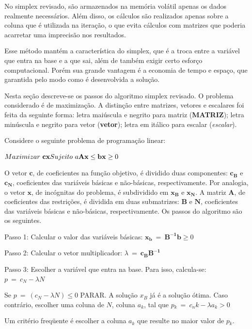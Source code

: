 No simplex revisado, são armazenados na memória volátil apenas os dados realmente necessários. Além disso, os cálculos são realizados apenas sobre a coluna que é utilizada na iteração, o que evita cálculos com matrizes que poderia acarretar uma imprecisão nos resultados.

Esse método mantém a característica do simplex, que é a troca entre a variável que entra na base e a que sai, além de também exigir certo esforço computacional. Porém sua grande vantagem é a economia de tempo e espaço, que garantida pelo modo como é desenvolvida a solução. 

Nesta seção descreve-se os passos do algoritmo simplex revisado. O problema considerado é de maximização. A distinção entre matrizes, vetores e escalares foi feita da seguinte forma: letra maiúscula e negrito para matriz (\textbf{MATRIZ}); letra minúscula e negrito para vetor (\textbf{vetor}); letra em itálico para escalar (\textit{escalar}).

Considere o seguinte problema de programação linear:

$\\
Maximizar\ \mathbf{cx} \\
Sujeito\ a \\
\mathbf{Ax} \leq \mathbf{b} \\
\mathbf{x} \geq0$

O vetor $\mathbf{c}$, de coeficientes na função objetivo, é dividido duas componentes: $\mathbf{c{_B}}$ e $\mathbf{c{_N}}$, coeficientes das variáveis básicas e não-básicas, respectivamente. Por analogia, o vetor $\mathbf{x}$, de incógnitas do problema, é subdividido em $\mathbf{x{_B}}$ e $\mathbf{x{_N}}$.  A matriz $\mathbf{A}$, de coeficientes das restrições, é dividida em duas submatrizes: $\mathbf{B}$ e $\mathbf{N}$, coeficientes das variáveis básicas e não-básicas, respectivamente. Os passos do algoritmo são os seguintes.

Passo 1: Calcular o valor das variáveis básicas: $\mathbf{x_{b}}\ =\ \mathbf{B^{-1}b}\geq0$

Passo 2: Calcular o vetor multiplicador: $\lambda \ =\ \mathbf{c{_B}B^{-1}}$

Passo 3: Escolher a variável que entra na base. Para isso, calcula-se: $p\ =\ c{_N}-\lambda N$

Se $p\ =\ (c{_N}-\lambda N)\leq 0$ PARAR. A solução $x{_B}$ já é a solução ótima. Caso contrário, escolher uma coluna de $N$, coluna $a{_k}$, tal que $p{_k}\ =\ c{_nk}-\lambda a{_k}> 0$

Um critério freqüente é escolher a coluna $a{_k}$ que resulte no maior valor de $p{_k}$.

